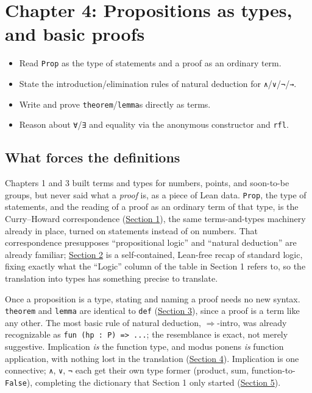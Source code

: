 \chapter{Chapter 4: Propositions as types, and basic proofs}\label{sec:04-propositions-and-proofs:00-index:1}

\begin{learningobjectives}
\begin{itemize}
\tightlist
\item
  Read \texttt{Prop} as the type of statements and a proof as an ordinary term.
\item
  State the introduction/elimination rules of natural deduction for \texttt{∧}/\texttt{∨}/\texttt{¬}/\texttt{→}.
\item
  Write and prove \texttt{theorem}/\texttt{lemma}s directly as terms.
\item
  Reason about \texttt{∀}/\texttt{∃} and equality via the anonymous constructor and \texttt{rfl}.
\end{itemize}
\end{learningobjectives}


\section{What forces the definitions}\label{sec:04-propositions-and-proofs:00-index:2}

Chapters 1 and 3 built terms and types for numbers, points, and soon-to-be groups, but never said what a \emph{proof} is, as a piece of Lean data. \texttt{Prop}, the type of statements, and the reading of a proof as an ordinary term of that type, is the Curry--Howard correspondence (\hyperref[sec:04-propositions-and-proofs:01-prop:1]{Section 1}), the same terms-and-types machinery already in place, turned on statements instead of on numbers. That correspondence presupposes ``propositional logic'' and ``natural deduction'' are already familiar; \hyperref[sec:04-propositions-and-proofs:02-logic-recap:1]{Section 2} is a self-contained, Lean-free recap of standard logic, fixing exactly what the ``Logic'' column of the table in Section 1 refers to, so the translation into types has something precise to translate.

Once a proposition is a type, stating and naming a proof needs no new syntax. \texttt{theorem} and \texttt{lemma} are identical to \texttt{def} (\hyperref[sec:04-propositions-and-proofs:03-theorem-lemma:1]{Section 3}), since a proof is a term like any other. The most basic rule of natural deduction, \(\Rightarrow\)-intro, was already recognizable as \texttt{fun (hp : P) => ...}; the resemblance is exact, not merely suggestive. Implication \emph{is} the function type, and modus ponens \emph{is} function application, with nothing lost in the translation (\hyperref[sec:04-propositions-and-proofs:04-implication:1]{Section 4}). Implication is one connective; \texttt{∧}, \texttt{∨}, \texttt{¬} each get their own type former (product, sum, function-to-\texttt{False}), completing the dictionary that Section 1 only started (\hyperref[sec:04-propositions-and-proofs:05-and-or-not:1]{Section 5}).

